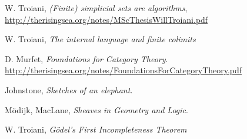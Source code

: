 \documentclass[12pt]{article}
\theoremstyle{plain}
\theoremstyle{definition}
\begin{document}
	\begin{thebibliography}{9}
		 W. Troiani, \emph{(Finite) simplicial sets are algorithms}, \url{http://therisingsea.org/notes/MScThesisWillTroiani.pdf}
		
		 W. Troiani, \emph{The internal language and finite colimits}
		
		 D. Murfet, \emph{Foundations for Category Theory}. \url{http://therisingsea.org/notes/FoundationsForCategoryTheory.pdf}
		
		 Johnstone, \emph{Sketches of an elephant}.
		
		 M\"{o}dijk, MacLane, \emph{Sheaves in Geometry and Logic}.
		
		 W. Troiani, \emph{G\"{o}del's First Incompleteness Theorem}
		
	\end{thebibliography}
	
	
	
	
\end{document}
